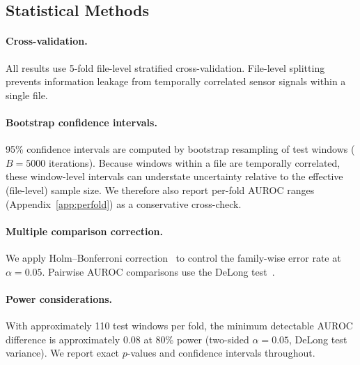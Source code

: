 \subsection{Statistical Methods}
\label{sec:statistical_methods}

\paragraph{Cross-validation.}
All results use 5-fold file-level stratified cross-validation.
File-level splitting prevents information leakage from temporally correlated sensor signals within a single file.

\paragraph{Bootstrap confidence intervals.}
95\% confidence intervals are computed by bootstrap resampling of test windows ($B = 5000$ iterations).
Because windows within a file are temporally correlated, these window-level intervals can understate uncertainty relative to the effective (file-level) sample size.
We therefore also report per-fold AUROC ranges (Appendix~\ref{app:perfold}) as a conservative cross-check.

\paragraph{Multiple comparison correction.}
We apply Holm--Bonferroni correction~\cite{holm1979simple} to control the family-wise error rate at $\alpha = 0.05$.
Pairwise AUROC comparisons use the DeLong test~\cite{delong1988comparing}.

\paragraph{Power considerations.}
With approximately 110 test windows per fold, the minimum detectable AUROC difference is approximately 0.08 at 80\% power (two-sided $\alpha = 0.05$, DeLong test variance).
We report exact $p$-values and confidence intervals throughout.
